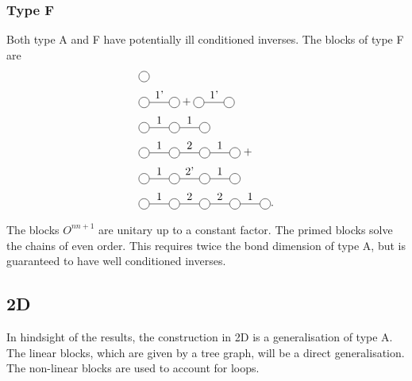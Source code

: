 \documentclass[twocolumn]{article}
\newcounter{a}
\newcounter{b}
\begin{document}
\subsubsection{Type F}
Both type A and F have potentially ill conditioned inverses. The blocks of type F are
\begin{subequations}
    \begin{align}
         & \mpob{1}{ {,}  }{}{}{}{{,,}}                                          \\
         & \mpob{2}{ {,"1'",}  }{}{}{}{{,,}}+  \mpob{2}{ {,"1'",}  }{}{}{}{{,,}} \\
         & \mpob{3}{ {,"1","1",}  }{}{}{}{{,,,}}                                 \\
         & \mpob{4}{ {,"1","2","1",}  }{}{}{}{{,,,,,}} \; +  \nonumber           \\
         & \mpob{4}{ {,"1","2'","1",}  }{}{}{}{{,,,,,}}                          \\
         & \mpob{5}{ {,"1","2","2","1",}  }{}{}{}{{,,,,,}} .
    \end{align}
\end{subequations}

The blocks $O^{n n+1}$ are unitary up to a constant factor. The primed blocks solve the chains of even order. This requires twice the bond dimension of type A, but is guaranteed to have well conditioned inverses.

\subsection{2D}
In hindsight of the results, the construction in 2D is a generalisation of type A. The linear blocks, which are given by a tree graph, will be a direct generalisation. The non-linear blocks are used to account for loops.
\end{document}
